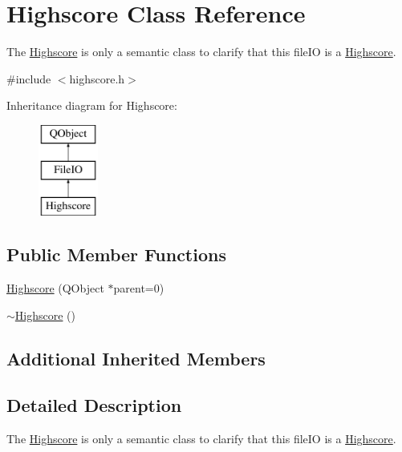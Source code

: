 \hypertarget{class_highscore}{\section{Highscore Class Reference}
\label{class_highscore}
}


The \hyperlink{class_highscore}{Highscore} is only a semantic class to clarify that this file\+I\+O is a \hyperlink{class_highscore}{Highscore}.  




{\ttfamily \#include $<$highscore.\+h$>$}

Inheritance diagram for Highscore\+:\begin{figure}[H]
\begin{center}
\leavevmode
\includegraphics[height=3.000000cm]{class_highscore}
\end{center}
\end{figure}
\subsection*{Public Member Functions}
\begin{DoxyCompactItemize}
\item 
\hyperlink{class_highscore_ab760f6092405a654479f34107dc38beb}{Highscore} (Q\+Object $\ast$parent=0)
\item 
\hyperlink{class_highscore_ac22dda9e0f6aeceab3c61035d6e1be5c}{$\sim$\+Highscore} ()
\end{DoxyCompactItemize}
\subsection*{Additional Inherited Members}


\subsection{Detailed Description}
The \hyperlink{class_highscore}{Highscore} is only a semantic class to clarify that this file\+I\+O is a \hyperlink{class_highscore}{Highscore}. 

